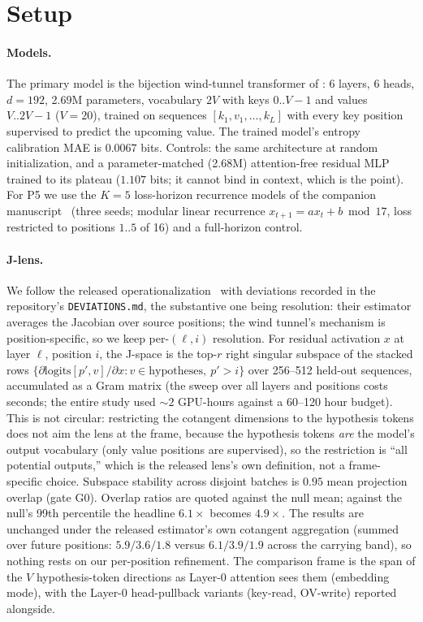 \documentclass[11pt]{article}
\newcommand{\Jspace}{J\mbox{-}space}
\begin{document}
\section{Setup}

\paragraph{Models.} The primary model is the bijection wind-tunnel
transformer of \citet{agarwal2026windtunnel}: 6 layers, 6 heads,
$d{=}192$, 2.69M parameters, vocabulary $2V$ with keys $0..V{-}1$ and
values $V..2V{-}1$ ($V{=}20$), trained on sequences
$[k_1, v_1, \dots, k_L]$ with every key position supervised to predict
the upcoming value. The trained model's entropy calibration MAE is
$0.0067$ bits. Controls: the same architecture at random initialization,
and a parameter-matched (2.68M) attention-free residual MLP trained to
its plateau ($1.107$ bits; it cannot bind in context, which is the
point). For P5 we use the $K{=}5$ loss-horizon recurrence models of the
companion manuscript~\citep{misra2026nature} (three seeds; modular linear
recurrence $x_{t+1} = ax_t + b \bmod 17$, loss restricted to positions
$1..5$ of 16) and a full-horizon control.

\paragraph{J-lens.} We follow the released
operationalization~\citep{anthropic2026jlens} with deviations recorded in
the repository's \texttt{DEVIATIONS.md}, the substantive one being
resolution: their estimator averages the Jacobian over source positions;
the wind tunnel's mechanism is position-specific, so we keep per-$(\ell,
i)$ resolution. For residual activation $x$ at layer $\ell$, position
$i$, the \Jspace{} is the top-$r$ right singular subspace of the stacked
rows $\{\partial \mathrm{logits}[p', v] / \partial x : v \in
\text{hypotheses},\ p' > i\}$ over 256--512 held-out sequences,
accumulated as a Gram matrix (the sweep over all layers and positions
costs seconds; the entire study used ${\sim}2$ GPU-hours against a
60--120 hour budget). This is not circular: restricting the
cotangent dimensions to the hypothesis tokens does not aim the lens at
the frame, because the hypothesis tokens \emph{are} the model's output
vocabulary (only value positions are supervised), so the restriction is
``all potential outputs,'' which is the released lens's own definition,
not a frame-specific choice. Subspace stability across disjoint batches is
$0.95$ mean projection overlap (gate G0). Overlap ratios are quoted
against the null mean; against the null's 99th percentile the headline
$6.1\times$ becomes $4.9\times$. The results are unchanged under the
released estimator's own cotangent aggregation (summed over future
positions: $5.9/3.6/1.8$ versus $6.1/3.9/1.9$ across the carrying
band), so nothing rests on our per-position refinement. The comparison frame is the
span of the $V$ hypothesis-token directions as Layer-0 attention sees
them (embedding mode), with the Layer-0 head-pullback variants (key-read,
OV-write) reported alongside.
\end{document}
